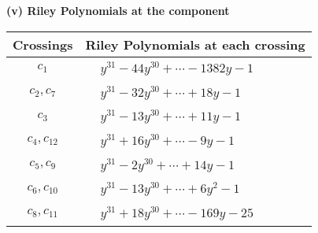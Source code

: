 \documentclass[1p]{elsarticle_modified}
\theoremstyle{definition}
\begin{document}
\newpage\renewcommand{\arraystretch}{1}
\flushleft \textbf{(v) Riley Polynomials at the component}\newline \\
\begin{tabular}{m{50pt}|m{274pt}}
Crossings & \hspace{64pt}Riley Polynomials at each crossing \\
\hline $$\begin{aligned}c_{1}\end{aligned}$$&$\begin{aligned}
&y^{31}-44 y^{30}+\cdots-1382 y-1
\end{aligned}$\\
\hline $$\begin{aligned}c_{2},c_{7}\end{aligned}$$&$\begin{aligned}
&y^{31}-32 y^{30}+\cdots+18 y-1
\end{aligned}$\\
\hline $$\begin{aligned}c_{3}\end{aligned}$$&$\begin{aligned}
&y^{31}-13 y^{30}+\cdots+11 y-1
\end{aligned}$\\
\hline $$\begin{aligned}c_{4},c_{12}\end{aligned}$$&$\begin{aligned}
&y^{31}+16 y^{30}+\cdots-9 y-1
\end{aligned}$\\
\hline $$\begin{aligned}c_{5},c_{9}\end{aligned}$$&$\begin{aligned}
&y^{31}-2 y^{30}+\cdots+14 y-1
\end{aligned}$\\
\hline $$\begin{aligned}c_{6},c_{10}\end{aligned}$$&$\begin{aligned}
&y^{31}-13 y^{30}+\cdots+6 y^2-1
\end{aligned}$\\
\hline $$\begin{aligned}c_{8},c_{11}\end{aligned}$$&$\begin{aligned}
&y^{31}+18 y^{30}+\cdots-169 y-25
\end{aligned}$\\
\hline
\end{tabular}\\~\\
\end{document}
